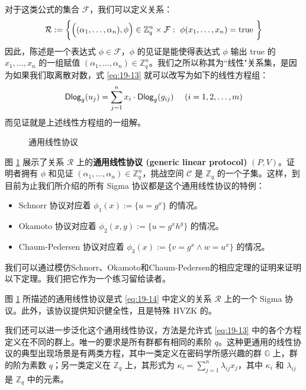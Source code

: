 对于这类公式的集合 $\mathcal{F}$，我们可以定义关系：
\begin{equation}\label{eq:19-14}
\mathcal{R}:=
\bigg\lbrace
\Big(
(\alpha_1,\dots,\alpha_n),\phi
\Big)
\in\mathbb{Z}_q^n\times\mathcal{F}: ~\phi(x_1,\dots,x_n)={\rm{true}}~
\bigg\rbrace
\end{equation}
因此，陈述是一个表达式 $\phi\in\mathcal{F}$，$\phi$ 的见证是能使得表达式 $\phi$ 输出 true 的 $x_1,\dots,x_n$ 的一组赋值 $(\alpha_1,\dots,\alpha_n)\in\mathbb{Z}_q^n$。我们之所以称其为``线性"关系集，是因为如果我们取离散对数，式 \ref{eq:19-13} 就可以改写为如下的线性方程组：
$$
{\rm\mathsf{Dlog}}_g(u_j)=\sum_{j=1}^nx_i\cdot {\rm\mathsf{Dlog}}_g(g_{ij})~~~~(i=1,2,\dots,m)
$$
而见证就是上述线性方程组的一组解。

\begin{figure}
  \centering
  
  \caption{通用线性协议}
  \label{fig:19-8}
\end{figure}

图 \ref{fig:19-8} 展示了关系 $\mathcal{R}$ 上的\textbf{通用线性协议 (generic linear protocol)} $(P,V)$。证明者拥有 $\phi$ 和见证 $(\alpha_1,\dots,\alpha_n)\in\mathbb{Z}_q^n$，挑战空间 $\mathcal{C}$ 是 $\mathbb{Z}_q$ 的一个子集。这样，到目前为止我们所介绍的所有 Sigma 协议都是这个通用线性协议的特例：
\begin{itemize}
	\item Schnorr 协议对应着 $\phi_1(x):=\{u=g^x\}$ 的情况。
	\item Okamoto 协议对应着 $\phi_2(x,y):=\{u=g^xh^y\}$ 的情况。
	\item Chaum-Pedersen 协议对应着 $\phi_3(x):=\{v=g^x\land w=u^x\}$ 的情况。
\end{itemize}

我们可以通过模仿Schnorr、Okamoto和Chaum-Pedersen的相应定理的证明来证明以下定理。我们把它作为一个练习留给读者。

\begin{theorem}\label{theo:19-11}
图 \ref{fig:19-8} 所描述的通用线性协议是式 \ref{eq:19-14} 中定义的关系 $\mathcal R$ 上的一个 Sigma 协议。此外，该协议提供知识健全性，且是特殊 HVZK 的。
\end{theorem}

我们还可以进一步泛化这个通用线性协议，方法是允许式 \ref{eq:19-13} 中的各个方程定义在不同的群上。唯一的要求是所有群都有相同的素阶 $q$。这种更通用的线性协议的典型出现场景是有两类方程，其中一类定义在密码学所感兴趣的群 $\mathbb{G}$ 上，群的阶为素数 $q$；另一类定义在 $\mathbb{Z}_q$ 上，其形式为 $\kappa_i=\sum_{j=1}^n\lambda_{ij}x_j$，其中 $\kappa_i$ 和 $\lambda_{ij}$ 是 $\mathbb{Z}_q$ 中的元素。

